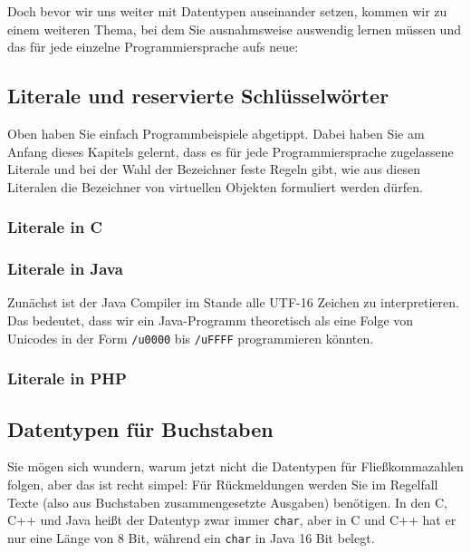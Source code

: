 Doch bevor wir uns weiter mit Datentypen auseinander setzen, kommen wir zu einem weiteren Thema, bei dem Sie ausnahmsweise auswendig lernen müssen und das für jede einzelne Programmiersprache aufs neue:

\subsection{Literale und reservierte Schlüsselwörter}

Oben haben Sie einfach Programmbeispiele abgetippt. Dabei haben Sie am Anfang dieses Kapitels gelernt, dass es für jede Programmiersprache zugelassene Literale und bei der Wahl der Bezeichner feste Regeln gibt, wie aus diesen Literalen die Bezeichner von virtuellen Objekten formuliert werden dürfen.

\subsubsection{Literale in C}

\subsubsection{Literale in Java}

Zunächst ist der Java Compiler im Stande alle UTF-16 Zeichen zu interpretieren. Das bedeutet, dass wir ein Java-Programm theoretisch als eine Folge von Unicodes in der Form \verb|/u0000| bis \verb|/uFFFF| programmieren könnten.\\




\subsubsection{Literale in PHP}


\subsection{Datentypen für Buchstaben}

Sie mögen sich wundern, warum jetzt nicht die Datentypen für Fließkommazahlen folgen, aber das ist recht simpel: Für Rückmeldungen werden Sie im Regelfall Texte (also aus Buchstaben zusammengesetzte Ausgaben) benötigen. In den C, C++ und Java heißt der Datentyp zwar immer \verb|char|, aber in C und C++ hat er nur eine Länge von 8 Bit, während ein \verb|char| in Java 16 Bit belegt.\\


